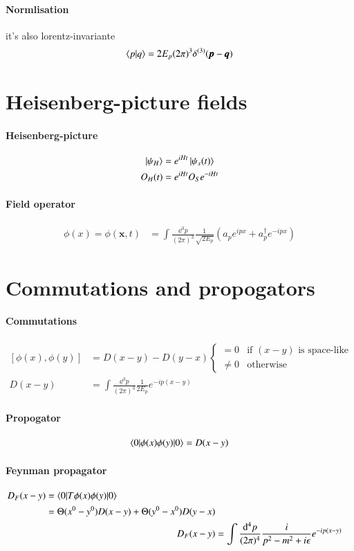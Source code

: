 \paragraph{Normlisation} it's also lorentz-invariante
\begin{align}
	\braket{p|q} = 2E_p (2\pi)^3 \delta^{(3)}(\pmb{p} - \pmb{q})
\end{align}
\section{Heisenberg-picture fields}
\paragraph{Heisenberg-picture}
\begin{align}
	\ket{\psi_H} &= e^{iHt}\ket{\psi_s (t)} \\
	O_H(t) & = e^{iHt}O_S e^{-iHt} 
\end{align}
\paragraph{Field operator}
\begin{align}
	\phi(x) = \phi({\pmb{x},t}) &= \int \frac{\dd^3 p}{(2\pi)^3}\frac{1}{\sqrt{2E_p}} \left( a_p e^{ipx} + a_{p}^\dagger e^{-i p x} \right)
\end{align}

\section{Commutations and propogators}
\paragraph{Commutations}
\begin{align}
	\left[ \phi(x), \phi(y) \right] &= D(x-y) - D(y-x)
	\begin{cases}
		= 0 & \text{if $(x-y)$ is space-like} \\
		\neq 0 & \text{otherwise}
	\end{cases} \\
	D(x-y) &= \int\frac{\dd^3p}{(2\pi)^3} \frac{1}{2E_p} e^{-ip(x-y)}
\end{align}
\paragraph{Propogator}
\begin{align}
	\braket{0 | \phi(x) \phi(y) | 0} = D(x-y)
\end{align}
\paragraph{Feynman propagator}
\begin{align}
	\begin{split}
	D_F(x-y) &= \braket{0 | T \phi(x) \phi(y) | 0} \\
			 &= \Theta(x^0 - y^0)D(x-y) + \Theta(y^0 - x^0) D(y-x)
	\end{split}\\
	D_F(x-y) &= \int \frac{\dd^4 p}{(2\pi)^4}\frac{i}{p^2-m^2+i\epsilon} e^{-ip(x-y)}
\end{align}

